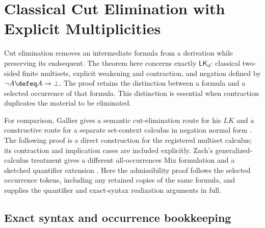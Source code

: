\section{Classical Cut Elimination with Explicit Multiplicities}
\label{sec:p07-classical-cut-elimination}

Cut elimination removes an intermediate formula from a derivation while
preserving its endsequent. The theorem here concerns exactly
\hyperref[sheet:lk-defneg]{\(\mathsf{LK}_{\mathrm d}\)}: classical
two-sided finite multisets, explicit weakening and contraction, and
negation defined by \(\neg A\defeq A\to\bot\).
The proof retains the distinction between a formula and a selected
occurrence of that formula. This distinction is essential when contraction
duplicates the material to be eliminated.

For comparison, Gallier gives a semantic cut-elimination route for his
\(LK\) and a constructive route for a separate set-context calculus in
negation normal form \cite[Secs.~6.1--6.2, 6.4.4]{Gallier2015}.
The following proof is a direct construction for the registered multiset
calculus; its contraction and implication cases are included explicitly.
Zach's generalized-calculus treatment gives a different all-occurrences
Mix formulation and a sketched quantifier extension
\cite[Thm.~10; Sec.~13]{Zach2021GeneralizedV2}.
Here the admissibility proof follows the selected occurrence tokens,
including any retained copies of the same formula, and supplies the
quantifier and exact-syntax realization arguments in full.

\subsection{Exact syntax and occurrence bookkeeping}

